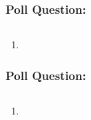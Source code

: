 \documentclass{beamer}
\begin{document}
%
%
\begin{frame}[fragile]
  \frametitle{Poll Question: }

  \begin{lstlisting}[language=Python, autogobble]

  \end{lstlisting}
  \vfill
  \begin{enumerate}[A]
    \item 
  \end{enumerate}
\end{frame}

%
%
\begin{frame}[fragile]
  \frametitle{Poll Question: }

  \begin{lstlisting}[language=Python, autogobble]

  \end{lstlisting}
  \vfill
  \begin{enumerate}[A]
    \item 
  \end{enumerate}
\end{frame}
\end{document}
